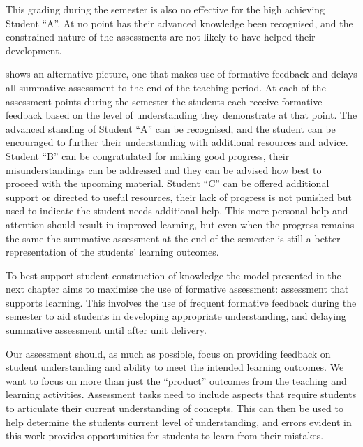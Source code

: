 %
%

This grading during the semester is also no effective for the high achieving Student ``A''. At no point has their advanced knowledge been recognised, and the constrained nature of the assessments are not likely to have helped their development. 

 shows an alternative picture, one that makes use of formative feedback and delays all summative assessment to the end of the teaching period. At each of the assessment points during the semester the students each receive formative feedback based on the level of understanding they demonstrate at that point. The advanced standing of Student ``A'' can be recognised, and the student can be encouraged to further their understanding with additional resources and advice. Student ``B'' can be congratulated for making good progress, their misunderstandings can be addressed and they can be advised how best to proceed with the upcoming material. Student ``C'' can be offered additional support or directed to useful resources, their lack of progress is not punished but used to indicate the student needs additional help. This more personal help and attention should result in improved learning, but even when the progress remains the same the summative assessment at the end of the semester is still a better representation of the students' learning outcomes.

%
%

\bigskip

To best support student construction of knowledge the model presented in the next chapter aims to maximise the use of formative assessment: assessment that supports learning. This involves the use of frequent formative feedback during the semester to aid students in developing appropriate understanding, and delaying summative assessment until after unit delivery.

Our assessment should, as much as possible, focus on providing feedback on student understanding and ability to meet the intended learning outcomes. We want to focus on more than just the ``product'' outcomes from the teaching and learning activities. Assessment tasks need to include aspects that require students to articulate their current understanding of concepts. This can then be used to help determine the students current level of understanding, and errors evident in this work provides opportunities for students to learn from their mistakes. 

